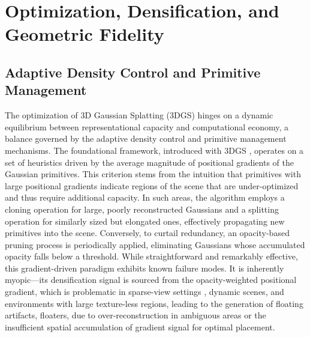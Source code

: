 \documentclass[11pt,a4paper]{article}
\begin{document}
\section{Optimization, Densification, and Geometric Fidelity}



\subsection{Adaptive Density Control and Primitive Management}


The optimization of 3D Gaussian Splatting (3DGS) hinges on a dynamic equilibrium between representational capacity and computational economy, a balance governed by the adaptive density control and primitive management mechanisms. The foundational framework, introduced with 3DGS \cite{arxiv:2308.04079v1}, operates on a set of heuristics driven by the average magnitude of positional gradients of the Gaussian primitives. This criterion stems from the intuition that primitives with large positional gradients indicate regions of the scene that are under-optimized and thus require additional capacity. In such areas, the algorithm employs a cloning operation for large, poorly reconstructed Gaussians and a splitting operation for similarly sized but elongated ones, effectively propagating new primitives into the scene. Conversely, to curtail redundancy, an opacity-based pruning process is periodically applied, eliminating Gaussians whose accumulated opacity falls below a threshold. While straightforward and remarkably effective, this gradient-driven paradigm exhibits known failure modes. It is inherently myopic---its densification signal is sourced from the opacity-weighted positional gradient, which is problematic in sparse-view settings \cite{arxiv:2312.07504v1}, dynamic scenes, and environments with large texture-less regions, leading to the generation of floating artifacts, floaters, due to over-reconstruction in ambiguous areas or the insufficient spatial accumulation of gradient signal for optimal placement.
\end{document}
